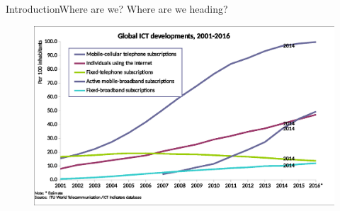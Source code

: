     \begin{frame}{Introduction}{Where are we? Where are we heading?}

%
%
%
%
%

        \begin{figure}[h]

            \centering

            \includegraphics[width=1\textwidth]{images/ict_Developments-2001_2016} 

            \label{fig:ictAdoption}


        \end{figure}


    \end{frame}

